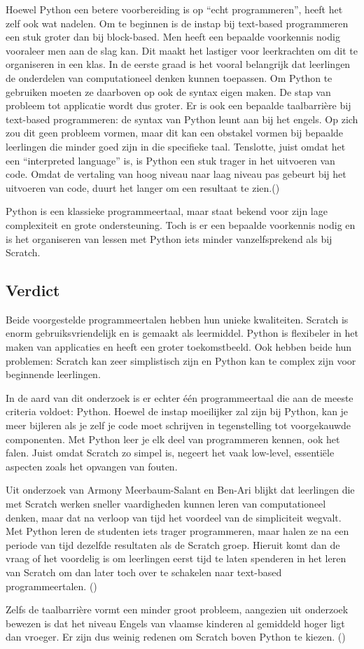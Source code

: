 Hoewel Python een betere voorbereiding is op “echt programmeren”, heeft het zelf ook wat nadelen. Om te beginnen is de instap bij text-based programmeren een stuk groter dan bij block-based. Men heeft een bepaalde voorkennis nodig vooraleer men aan de slag kan. Dit maakt het lastiger voor leerkrachten om dit te organiseren in een klas.
In de eerste graad is het vooral belangrijk dat leerlingen de onderdelen van computationeel denken kunnen toepassen. Om Python te gebruiken moeten ze daarboven op ook de syntax eigen maken. De stap van probleem tot applicatie wordt dus groter. 
Er is ook een bepaalde taalbarrière bij text-based programmeren: de syntax van Python leunt aan bij het engels. Op zich zou dit geen probleem vormen, maar dit kan een obstakel vormen bij bepaalde leerlingen die minder goed zijn in die specifieke taal.
Tenslotte, juist omdat het een “interpreted language” is,  is Python een stuk trager in het uitvoeren van code. Omdat de vertaling van hoog niveau naar laag niveau pas gebeurt bij het uitvoeren van code, duurt het langer om een resultaat te zien.(\cite{Armoni2015})

Python is een klassieke programmeertaal, maar staat bekend voor zijn lage complexiteit en grote ondersteuning. Toch is er een bepaalde voorkennis nodig en is het organiseren van lessen met Python iets minder vanzelfsprekend als bij Scratch.

\subsection{Verdict}

Beide voorgestelde programmeertalen hebben hun unieke kwaliteiten. Scratch is enorm gebruiksvriendelijk en is gemaakt als leermiddel. Python is flexibeler in het maken van applicaties en heeft een groter toekomstbeeld. Ook hebben beide hun problemen: Scratch kan zeer simplistisch zijn en Python kan te complex zijn voor beginnende leerlingen. 

In de aard van dit onderzoek is er echter één programmeertaal die aan de meeste criteria voldoet: Python. Hoewel de instap moeilijker zal zijn bij Python, kan je meer bijleren als je zelf je code moet schrijven in tegenstelling tot voorgekauwde componenten. Met Python leer je elk deel van programmeren kennen, ook het falen. Juist omdat Scratch zo simpel is, negeert het vaak low-level, essentiële aspecten zoals het opvangen van fouten. 

Uit onderzoek van Armony Meerbaum-Salant en Ben-Ari blijkt dat leerlingen die met Scratch werken sneller vaardigheden kunnen leren van computationeel denken, maar dat na verloop van tijd het voordeel van de simpliciteit wegvalt. Met Python leren de studenten iets trager programmeren, maar halen ze na een periode van tijd dezelfde resultaten als de Scratch groep. Hieruit komt dan de vraag of het voordelig is om leerlingen eerst tijd te laten spenderen in het leren van Scratch om dan later toch over te schakelen naar text-based programmeertalen. (\cite{Armoni2015,Fagan2017})

Zelfs de taalbarrière vormt een minder groot probleem, aangezien uit onderzoek bewezen is dat het niveau Engels van vlaamse kinderen al gemiddeld hoger ligt dan vroeger. Er zijn dus weinig redenen om Scratch boven Python te kiezen. (\cite{Denies2015})




